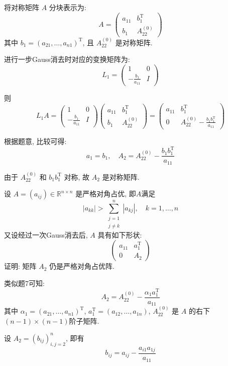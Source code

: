 \documentclass[12pt, answers]{exam}     %
\newcommand{\R}{\mathbb{R}}
\newcommand{\T}{\mathrm{T}}
\begin{document}
\begin{questions}
\begin{solution}
将对称矩阵 \( A \) 分块表示为: 
\[
A = 
\begin{pmatrix}
a_{11} & b_1^{\T} \\
b_1 & A_{22}^{(0)}
\end{pmatrix}
\]
其中 \( b_1 = (a_{21}, \ldots, a_{n1})^{\T} \), 且 \( A_{22}^{(0)} \) 是对称矩阵. 

进行一步Gauss消去时对应的变换矩阵为: 
\[
L_1 = 
\begin{pmatrix}
1 & 0 \\
-\frac{b_1}{a_{11}} & I
\end{pmatrix}
\]

则 
\[
L_1 A = 
\begin{pmatrix}
1 & 0 \\
-\frac{b_1}{a_{11}} & I
\end{pmatrix}
\begin{pmatrix}
a_{11} & b_1^{\T} \\
b_1 & A_{22}^{(0)}
\end{pmatrix}
=
\begin{pmatrix}
a_{11} & b_1^{\T} \\
0 & A_{22}^{(0)} - \frac{b_1 b_1^{\T}}{a_{11}}
\end{pmatrix}
\]

根据题意, 比较可得: 
\[
a_1 = b_1, \quad A_2 = A_{22}^{(0)} - \frac{b_1 b_1^{\T}}{a_{11}}
\]

由于 \( A_{22}^{(0)} \) 和 \( b_1 b_1^{\T} \) 对称, 
故 \( A_2 \) 是对称矩阵.
\end{solution}

\question{}设 \( A = (a_{ij}) \in \R^{n \times n} \) 是严格对角占优, 即$A$满足
\[ |a_{kk}| > \sum_{\substack{j=1 \\ j \neq k}}^n |a_{kj}|, \quad k = 1,\ldots,n \]
又设经过一次Gauss消去后, \( A \) 具有如下形状: 
\[
\begin{pmatrix}
a_{11} & a_1^{\T} \\
0 & A_2
\end{pmatrix}
\]
证明: 矩阵 \( A_2 \) 仍是严格对角占优阵.

\begin{solution}
类似题7可知: 
\[ A_2 = A_{22}^{(0)} - \frac{\alpha_1 a_1^{\T}}{a_{11}} \]
其中 \( \alpha_1 = (a_{21}, \ldots, a_{n1})^{\T} \), \( a_1^{\T} = (a_{12}, \ldots, a_{1n}) \), \( A_{22}^{(0)} \) 是 \( A \) 的右下$(n - 1) \times (n - 1)$阶子矩阵. 

设 \( A_2 = (b_{ij})_{i,j=2}^n \), 即有 
\[ b_{ij} = a_{ij} - \frac{a_{i1}a_{1j}}{a_{11}} \]


\end{solution}
\end{questions}
\end{document}
